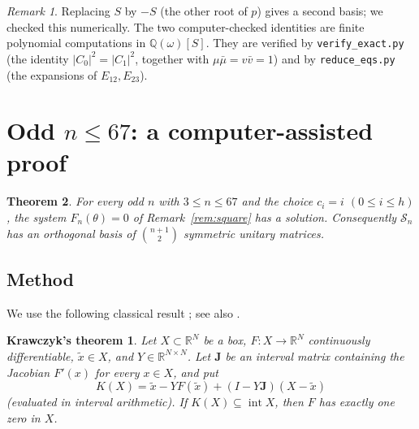 \documentclass[11pt]{amsart}
\newtheorem{theorem}{Theorem}
\newtheorem*{krawczyk}{Krawczyk's theorem}
\theoremstyle{definition}
\theoremstyle{remark}
\newtheorem{remark}[theorem]{Remark}
\newcommand{\R}{\mathbb{R}}
\newcommand{\Q}{\mathbb{Q}}
\newcommand{\Sym}{\mathcal{S}}
\begin{document}
\begin{remark}
Replacing $S$ by $-S$ (the other root of $p$) gives a second basis; we checked this numerically. The two computer-checked identities are finite polynomial computations in $\Q(\omega)[S]$. They are verified by \texttt{verify\_exact.py} (the identity $|C_0|^2=|C_1|^2$, together with $\mu\bar\mu=v\bar v=1$) and by \texttt{reduce\_eqs.py} (the expansions of $E_{12},E_{23}$).
\end{remark}

\section{Odd \texorpdfstring{$n\le 67$}{n<=67}: a computer-assisted proof}\label{sec:cap}

\begin{theorem}\label{thm:main}
For every odd $n$ with $3\le n\le 67$ and the choice $c_i=i$ $(0\le i\le h)$, the system $F_n(\theta)=0$ of Remark~\ref{rem:square} has a solution. Consequently $\Sym_n$ has an orthogonal basis of $\binom{n+1}{2}$ symmetric unitary matrices.
\end{theorem}

\subsection{Method}
We use the following classical result \cite{Kra69,Moo77}; see also \cite{Rum10}.

\begin{krawczyk}
Let $X\subset\R^N$ be a box, $F:X\to\R^N$ continuously differentiable, $\tilde x\in X$, and $Y\in\R^{N\times N}$. Let $\mathbf J$ be an interval matrix containing the Jacobian $F'(x)$ for every $x\in X$, and put
\[
K(X)=\tilde x-YF(\tilde x)+(I-Y\mathbf J)(X-\tilde x)
\]
(evaluated in interval arithmetic). If $K(X)\subseteq\operatorname{int}X$, then $F$ has exactly one zero in $X$.
\end{krawczyk}
\end{document}
